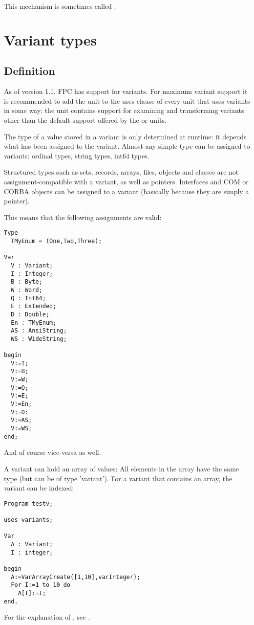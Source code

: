 This mechanism is sometimes called .

\section{Variant types}
 
\subsection{Definition}
As of version 1.1, FPC has support for variants. For maximum variant support 
it is recommended to add the  unit to the uses clause of every 
unit that uses variants in some way: the  unit contains support for
examining and transforming variants other than the default support offered
by the  or  units.

The type of a value stored in a variant is only determined at runtime: 
it depends what has been assigned to the variant. Almost any simple type 
can be assigned to variants: ordinal types, string types, int64 types.

Structured types such as sets, records, arrays, files, objects and classes 
are not assignment-compatible with a variant, as well as pointers. 
Interfaces and COM or CORBA objects can be assigned to a
variant (basically because they are simply a pointer).

This means that the following assignments are valid:
\begin{verbatim}
Type
  TMyEnum = (One,Two,Three);

Var
  V : Variant;
  I : Integer;
  B : Byte;
  W : Word;
  Q : Int64;
  E : Extended;
  D : Double;
  En : TMyEnum;
  AS : AnsiString;
  WS : WideString;

begin
  V:=I;
  V:=B;
  V:=W;
  V:=Q;
  V:=E;
  V:=En;
  V:=D:
  V:=AS;
  V:=WS;
end;
\end{verbatim}
And of course vice-versa as well.

A variant can hold an array of values: All elements in the array have
the same type (but can be of type 'variant'). For a variant 
that contains an array, the variant can be indexed:
\begin{verbatim}
Program testv;

uses variants;

Var
  A : Variant;
  I : integer;

begin
  A:=VarArrayCreate([1,10],varInteger);
  For I:=1 to 10 do
    A[I]:=I;
end.
\end{verbatim}
For the explanation of , see \unitsref.

